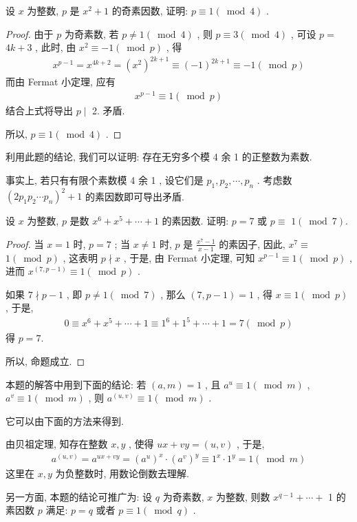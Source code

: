 \begin{example}
	设 $x$ 为整数,  $p$ 是 $x^{2}+1$ 的奇素因数, 证明:  $p \equiv 1(\bmod 4)$ .
\end{example}
\begin{proof}
	由于 $p$ 为奇素数, 若 $p \neq 1(\bmod 4)$ , 则 $p \equiv 3(\bmod 4)$ , 可设 $p=$ $4 k+3$ , 此时, 由 $x^{2} \equiv-1(\bmod p)$ , 得
	\begin{align*}
		x^{p-1}=x^{4 k+2}=\left(x^{2}\right)^{2 k+1} \equiv(-1)^{2 k+1} \equiv-1(\bmod p)
	\end{align*}
	而由 Fermat 小定理, 应有
	\begin{align*}
		x^{p-1} \equiv 1(\bmod p)
	\end{align*}
	结合上式将导出 $p \mid$ 2. 矛盾.

	所以,  $p \equiv 1(\bmod 4)$ .
\end{proof}
\begin{note}
	利用此题的结论, 我们可以证明: 存在无穷多个模 4 余 1 的正整数为素数.

	事实上, 若只有有限个素数模 4 余 1 , 设它们是 $p_{1}, p_{2}, \cdots, p_{n}$ . 考虑数 $\left(2 p_{1} p_{2} \cdots p_{n}\right)^{2}+1$ 的素因数即可导出矛盾.
\end{note}

\begin{example}
	设 $x$ 为整数,  $p$ 是数 $x^{6}+x^{5}+\cdots+1$ 的素因数. 证明:  $p=7$ 或 $p \equiv$ $1(\bmod 7)$.
\end{example}
\begin{proof}
	当 $x=1$ 时,  $p=7$ ; 当 $x \neq 1$ 时,  $p$ 是 $\frac{x^{7}-1}{x-1}$ 的素因子, 因此,  $x^{7} \equiv$ $1(\bmod p)$ , 这表明 $p \nmid x$ , 于是, 由 Fermat 小定理, 可知 $x^{p-1} \equiv 1(\bmod p)$ , 进而 $x^{(7, p-1)} \equiv 1(\bmod p)$ .

	如果 $7 \nmid p-1$ , 即 $p \neq 1(\bmod 7)$ , 那么 $(7, p-1)=1$ , 得 $x \equiv 1(\bmod p)$ , 于是,
	\begin{align*}
		0 \equiv x^{6}+x^{5}+\cdots+1 \equiv 1^{6}+1^{5}+\cdots+1=7(\bmod p)
	\end{align*}
	得 $p=7$.

	所以, 命题成立.
\end{proof}
\begin{note}
	本题的解答中用到下面的结论: 若 $(a, m)=1$ , 且 $a^{u} \equiv 1(\bmod m)$ ,  $a^{v} \equiv 1(\bmod m)$ , 则 $a^{(u, v)} \equiv 1(\bmod m)$ .

	它可以由下面的方法来得到.

	由贝祖定理, 知存在整数 $x ,  y$ , 使得 $u x+v y=(u, v)$ , 于是,
	\begin{align*}
		a^{(u, v)}=a^{u x+v y}=\left(a^{u}\right)^{x} \cdot\left(a^{v}\right)^{y} \equiv 1^{x} \cdot 1^{y}=1(\bmod m)
	\end{align*}
	这里在 $x ,  y$ 为负整数时, 用数论倒数去理解.

	另一方面, 本题的结论可推广为: 设 $q$ 为奇素数,  $x$ 为整数, 则数 $x^{q-1}+\cdots+$ 1 的素因数 $p$ 满足:  $p=q$ 或者 $p \equiv 1(\bmod q)$ .
\end{note}

